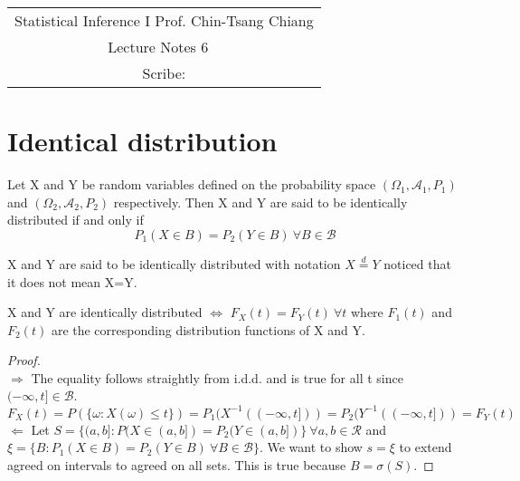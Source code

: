 \documentclass[../Probability_Theory.tex]{subfiles}
\begin{document}
	\begin{center}
		\renewcommand{\arraystretch}{2}
		\begin{bfseries}
			\begin{tabular}{|c|}
				\hline
				Statistical Inference I \hfill Prof. Chin-Tsang Chiang\\
				\hspace{15em} {\large Lecture Notes 6} \hspace{15em}\ \\
				\lecdate \hfill Scribe: \scribe\\
				\hline
			\end{tabular}
			\renewcommand{\arraystretch}{1}
		\end{bfseries}
	\end{center}

\section{Identical distribution}
\begin{definition}[i.d.d.]
Let X and Y be random variables defined on the probability space $(\Omega_1,\mathcal{A}_1,P_1)$ and $(\Omega_2,\mathcal{A}_2,P_2)$ respectively. Then X and Y are said to be identically distributed if and only if $$P_1(X\in B)=P_2(Y\in B)\ \forall B\in\mathcal{B}$$ 
\end{definition}
\begin{remark}
X and Y are said to be identically distributed with notation $X\overset{d}{=}Y$ noticed that it does not mean X=Y.
\end{remark}
\begin{property}X and Y are identically distributed $\Leftrightarrow$ $F_X(t)=F_Y(t)\ \forall t$ where $F_1(t)$ and $F_2(t)$ are the corresponding distribution functions of X and Y.
\end{property}
\begin{proof}\\
{\bf $\Rightarrow$} The equality follows straightly from i.d.d. and is true for all t since $(-\infty,t]\in\mathcal{B}$. $$F_X(t)=P(\{\omega:X(\omega)\leq t\})=P_1(X^{-1}((-\infty,t]))=P_2(Y^{-1}((-\infty,t]))=F_Y(t)$$ 
{\bf $\Leftarrow$} Let $S=\{(a,b]:P(X\in(a,b])=P_2(Y\in(a,b])\}\ \forall a,b\in\mathcal{R}$ and $\xi=\{B:P_1(X\in B)=P_2(Y\in B)\ \forall B\in\mathcal{B}\}$. We want to show $s=\xi$ to extend agreed on intervals to agreed on all sets. This is true because $B=\sigma(S)$.
\end{proof}
\end{document}
